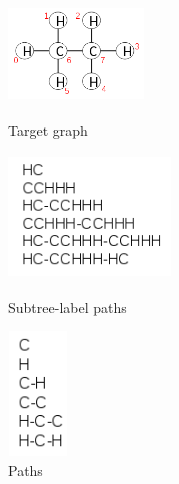 \documentclass{l4proj}
\theoremstyle{definition}
\begin{document}
\begin{figure}[h]
  \begin{minipage}[t]{.3\textwidth}
    \centering
    \includegraphics[height=2.6cm,width=3.6cm]{images/graphs/C2H6.png}
    \caption{Target graph}
    \label{C2H6}
  \end{minipage}
  \begin{minipage}[t]{.3\textwidth}
  \centering
  \includegraphics[height=3.3cm,width=4.3cm]{images/paths/C2H6-isomer-paths.png}
  \caption{Subtree-label paths}
  \label{C2H6-subtree-label-paths} %
  \end{minipage}
  \begin{minipage}[t]{.3\textwidth}
  \centering
  \includegraphics[height=3.3cm,width=1.6cm]{images/paths/C2H6-paths.png}
  \caption{Paths}
  \label{C2H6-paths}
  \end{minipage}
\end{figure}
\end{document}
